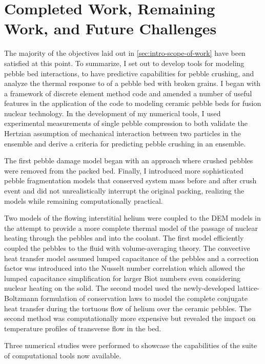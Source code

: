 \chapter{Completed Work, Remaining Work, and Future Challenges}\label{sec:remaining}

The majority of the objectives laid out in \cref{sec:intro-scope-of-work} have been satisfied at this point. To summarize, I set out to develop tools for modeling pebble bed interactions, to have predictive capabilities for pebble crushing, and analyze the thermal response to of a pebble bed with broken grains. I began with a framework of discrete element method code and amended a number of useful features in the application of the code to modeling ceramic pebble beds for fusion nuclear technology. In the development of my numerical tools, I used experimental measurements of single pebble compression to both validate the Hertzian assumption of mechanical interaction between two particles in the ensemble and derive a criteria for predicting pebble crushing in an ensemble.

The first pebble damage model began with an approach where crushed pebbles were removed from the packed bed. Finally, I introduced more sophisticated pebble fragmentation models that conserved system mass before and after crush event and did not unrealistically interrupt the original packing, realizing the models while remaining computationally practical. 

Two models of the flowing interstitial helium were coupled to the DEM models in the attempt to provide a more complete thermal model of the passage of nuclear heating through the pebbles and into the coolant. The first model efficiently coupled the pebbles to the fluid with volume-averaging theory. The convective heat transfer model assumed lumped capacitance of the pebbles and a correction factor was introduced into the Nusselt number correlation which allowed the lumped capacitance simplification for larger Biot numbers even considering nuclear heating on the solid. The second model used the newly-developed lattice-Boltzmann formulation of conservation laws to model the complete conjugate heat transfer during the tortuous flow of helium over the ceramic pebbles. The second method was computationally more expensive but revealed the impact on temperature profiles of transverse flow in the bed.


Three numerical studies were performed to showcase the capabilities of the suite of computational tools now available.




